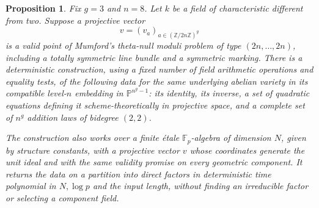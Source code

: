 \documentclass[11pt]{article}
\newtheorem{proposition}[theorem]{Proposition}
\theoremstyle{definition}
\theoremstyle{remark}
\begin{document}
\begin{proposition}\label{prop:fixed-theta-complete-atlas}
Fix \(g=3\) and \(n=8\). Let \(k\) be a field of characteristic
different from two. Suppose a projective vector
\[
 v=(v_a)_{a\in(\mathbb Z/2n\mathbb Z)^g}
\]
is a valid point of Mumford's theta-null moduli problem of type
\((2n,\ldots,2n)\), including a totally symmetric line bundle and
a symmetric marking.
There is a deterministic construction, using a fixed number of field
arithmetic operations and equality tests, of the following data for the
same underlying abelian variety in its compatible level-\(n\)
embedding in \(\mathbb P^{n^g-1}\): its identity, its inverse, a set of
quadratic equations defining it scheme-theoretically in projective
space, and a complete set of \(n^g\) addition laws of bidegree
\((2,2)\).

The construction also works over a finite \'etale \(\mathbb F_p\)-algebra
of dimension \(N\), given by structure constants, with a projective
vector \(v\) whose coordinates generate the unit ideal and with the
same validity promise on every geometric component. It returns the
data on a partition into direct factors in deterministic time
polynomial in \(N,\log p\) and the input length, without finding an
irreducible factor or selecting a component field.
\end{proposition}
\end{document}
